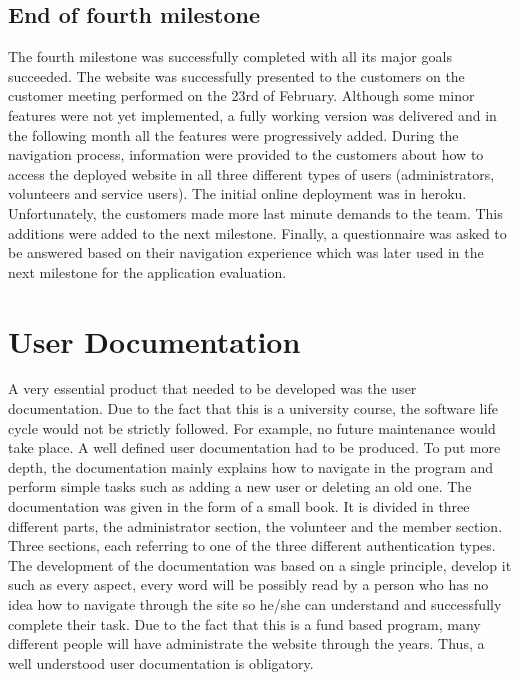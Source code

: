 \documentclass{l3proj}
\begin{document}

\subsection{End of fourth milestone}
\label{sec:milestone4}

The fourth milestone was successfully completed with all its major goals succeeded. The website was successfully presented to the customers on the customer meeting performed on the 23rd of February. Although some minor features were not yet implemented, a fully working version was delivered and in the following month all the features were progressively added. During the navigation process, information were provided to the customers about how to access the deployed website in all three different types of users (administrators, volunteers and service users). The initial online deployment was in heroku. Unfortunately, the customers made more last minute demands to the team. This additions were added to the next milestone. Finally, a questionnaire was asked to be answered based on their navigation experience which was later used in the next milestone for the application evaluation.

\section{User Documentation}
\label{sec:user_doc}
A very essential product that needed to be developed was the user documentation. Due to the fact that this is a university course, the software life cycle would not be strictly followed. For example, no future maintenance would take place. A well defined user documentation had to be produced. To put more depth, the documentation mainly explains how to navigate in the program and perform simple tasks such as adding a new user or deleting an old one. The documentation was given in the form of a small book. It is divided in three different parts, the administrator section, the volunteer and the member section. Three sections, each referring to one of the three different authentication types. The development of the documentation was based on a single principle, develop it such as every aspect, every word will be possibly read by a person who has no idea how to navigate through the site so he/she can understand and successfully complete their task. Due to the fact that this is a fund based program, many different people will have administrate the website through the years. Thus, a well understood user documentation is obligatory.
\end{document}
